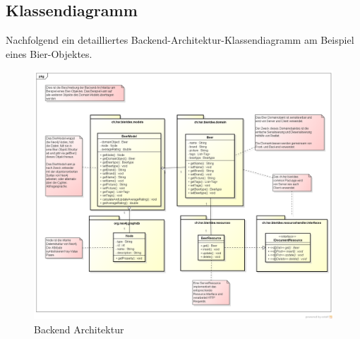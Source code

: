 \documentclass[10pt,a4paper]{scrartcl}
\begin{document}
\subsection{Klassendiagramm}

Nachfolgend ein detailliertes Backend-Architektur-Klassendiagramm am Beispiel eines Bier-Objektes.

\begin{figure}[H]
	\includegraphics[height=0.95\textwidth,angle=90]{BackendArchitektur.png}
	\caption{Backend Architektur}
	\label{fig:backend_architecture}
\end{figure}
\end{document}
